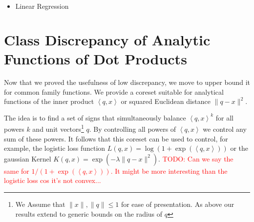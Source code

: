 \documentclass[anon,12pt]{colt2019} %
\newcommand{\todo}[1]{\textcolor{red}{TODO: #1}}
\newcommand{\ip}[1]{\left \langle #1 \right \rangle}
\newcommand{\eps}{\epsilon}
\begin{document}
\begin{itemize}
\item Linear Regression \cite{DBLP:journals/jmlr/DerezinskiW18}
\end{itemize}




\section{Class Discrepancy of Analytic Functions of Dot Products} \label{sec:analytic}

Now that we proved the usefulness of low discrepancy, we move to upper bound it for common family functions. We provide a coreset suitable for analytical functions of the inner product $\ip{q,x}$ or squared Euclidean distance $\|q-x\|^2$. 

The idea is to find a set of signs that simultaneously balance $\ip{q,x}^k$ for all powers $k$ and unit vectors\footnote{We Assume that $\|x\|,\|q\| \leq 1$ for ease of presentation. As above our results extend to generic bounds on the radius of $q$} $q$. By controlling all powers of $\ip{q,x}$ we control any sum of these powers. It follows that this coreset can be used to control, for example, the logistic loss function $L(q,x) = \log(1+\exp(\ip{q,x}))$ or the gaussian Kernel $K(q,x) = \exp(-\lambda \|q-x\|^2)$. \todo{Can we say the same for $1/(1 + \exp(\ip{q,x}))$. It might be more interesting than the logistic loss cos it's not convex...}
\end{document}
